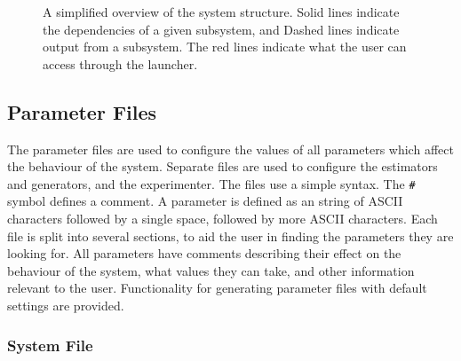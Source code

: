 \documentclass[a4paper,11pt,twoside]{article}
\begin{document}
\begin{figure}
   \caption{A simplified overview of the system structure. Solid lines indicate
   the dependencies of a given subsystem, and Dashed lines indicate output from a
   subsystem. The red lines indicate what the user can access through the launcher.}
   \label{fig:sysstruct}
   \end{figure}
\subsection{Parameter Files}
\label{sec-6-2}

   The parameter files are used to configure the values of all parameters which
   affect the behaviour of the system. Separate files are used to configure the
   estimators and generators, and the experimenter. The files use a simple
   syntax. The \texttt{\#} symbol defines a comment. A parameter is defined as
   an string of ASCII characters followed by a single space, followed by more
   ASCII characters. Each file is split into several sections, to aid the user
   in finding the parameters they are looking for. All parameters have comments
   describing their effect on the behaviour of the system, what values they can
   take, and other information relevant to the user. Functionality for
   generating parameter files with default settings are provided.
\subsubsection{System File}
\label{sec-6-2-1}
\end{document}
